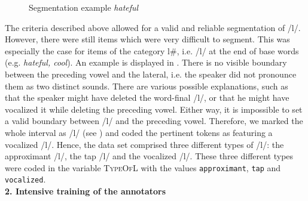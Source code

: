 \begin{figure} [b!]
	\centering
	\caption{Segmentation example \textit{hateful}}
	\label{fig:segmentation hateful}
\end{figure}

The criteria described above allowed for a valid and reliable segmentation of /l/. However, there were still items which were very difficult to segment. This was especially the case for items of the category l\#, i.e. /l/ at the end of base words (e.g. \textit{hateful, cool}). An example is displayed in . There is no visible boundary between the preceding vowel and the lateral, i.e. the speaker did not pronounce them as two distinct sounds. There are various possible explanations, such as that the speaker might have deleted the word-final /l/, or that he might have vocalized it  while deleting the preceding vowel. Either way,  it is impossible to set a valid boundary between /l/ and the preceding vowel. Therefore, we marked the whole interval as /l/ (see ) and coded the pertinent tokens as featuring a vocalized /l/. Hence, the data set comprised three different types of /l/: the approximant /l/, the tap /l/ and the vocalized /l/. These three different types were coded in the variable \textsc{TypeOfL} with the values \texttt{approximant}, \texttt{tap} and \texttt{vocalized}.\\



\textbf{ 2.  Intensive training of the annotators}\\

